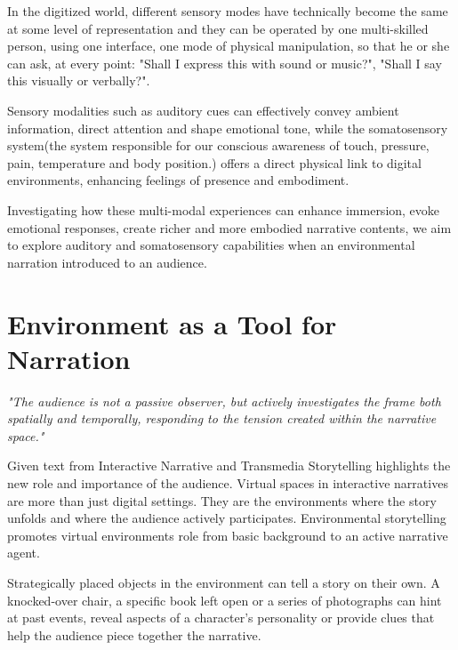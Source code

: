     In the digitized world, different sensory modes have technically become the same at some level of representation and they can be operated by one multi-skilled person, using one interface, one mode of physical manipulation, so that he or she can ask, at every point: "Shall I express this with sound or music?", "Shall I say this visually or verbally?"\cite{Multimodal_Discourse}.\par

    Sensory modalities such as auditory cues can effectively convey ambient information, direct attention and shape emotional tone, while the somatosensory system(the system responsible for our conscious awareness of touch, pressure, pain, temperature and body position\cite{Somatic_Sensory}.) offers a direct physical link to digital environments, enhancing feelings of presence and embodiment.\par

    Investigating how these multi-modal experiences can enhance immersion, evoke emotional responses, create richer and more embodied narrative contents, we aim to explore auditory and somatosensory capabilities when an environmental narration introduced to an audience.\par
    \section{Environment as a Tool for Narration} 
    \emph{"The audience is not a passive observer, but actively investigates the frame both spatially and temporally, responding to the tension created within the narrative space\cite{Transmedia_Storytelling}."}

    Given text from Interactive Narrative and Transmedia Storytelling highlights the new role and importance of the audience. Virtual spaces in interactive narratives are more than just digital settings. They are the environments where the story unfolds and where the audience actively participates. Environmental storytelling promotes virtual environments role from basic background to an active narrative agent.\par

    Strategically placed objects in the environment can tell a story on their own. A knocked-over chair, a specific book left open or a series of photographs can hint at past events, reveal aspects of a character's personality or provide clues that help the audience piece together the narrative\cite{Environmental_Storytelling_Blogpost}.\par 

